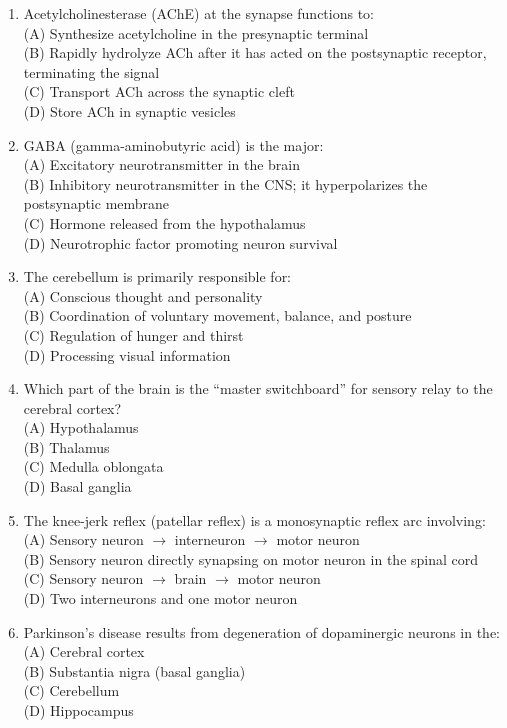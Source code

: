 \documentclass{article}
\begin{document}
\begin{enumerate}[label=Q\arabic*.]
\item Acetylcholinesterase (AChE) at the synapse functions to:
\\(A) Synthesize acetylcholine in the presynaptic terminal
\\(B) Rapidly hydrolyze ACh after it has acted on the postsynaptic receptor, terminating the signal
\\(C) Transport ACh across the synaptic cleft
\\(D) Store ACh in synaptic vesicles

\item GABA (gamma-aminobutyric acid) is the major:
\\(A) Excitatory neurotransmitter in the brain
\\(B) Inhibitory neurotransmitter in the CNS; it hyperpolarizes the postsynaptic membrane
\\(C) Hormone released from the hypothalamus
\\(D) Neurotrophic factor promoting neuron survival

\item The cerebellum is primarily responsible for:
\\(A) Conscious thought and personality
\\(B) Coordination of voluntary movement, balance, and posture
\\(C) Regulation of hunger and thirst
\\(D) Processing visual information

\item Which part of the brain is the ``master switchboard'' for sensory relay to the cerebral cortex?
\\(A) Hypothalamus
\\(B) Thalamus
\\(C) Medulla oblongata
\\(D) Basal ganglia

\item The knee-jerk reflex (patellar reflex) is a monosynaptic reflex arc involving:
\\(A) Sensory neuron $\rightarrow$ interneuron $\rightarrow$ motor neuron
\\(B) Sensory neuron directly synapsing on motor neuron in the spinal cord
\\(C) Sensory neuron $\rightarrow$ brain $\rightarrow$ motor neuron
\\(D) Two interneurons and one motor neuron

\item Parkinson's disease results from degeneration of dopaminergic neurons in the:
\\(A) Cerebral cortex
\\(B) Substantia nigra (basal ganglia)
\\(C) Cerebellum
\\(D) Hippocampus


\end{enumerate}
\end{document}
